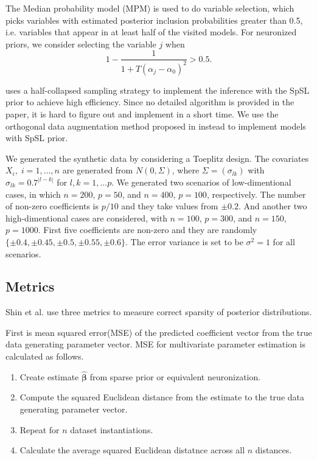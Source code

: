 The Median probability model (MPM) is used to do variable selection, which picks variables with estimated posterior inclusion
probabilities greater than 0.5, i.e. variables that appear in at least half of the visited models. For neuronized priors, we consider selecting the variable $j$ when
$$1-\frac{1}{1+ T(\alpha_j-\alpha_0)^2} > 0.5.$$

\citet{shin2021neuronized} uses a half-collapsed sampling strategy to implement the inference with the SpSL prior to achieve high efficiency. Since no detailed algorithm is provided in the paper, it is hard to figure out and implement in a short time. We use the orthogonal data augmentation method proposed in \citet{ghosh2011rao} instead to implement models with SpSL prior.

We generated the synthetic data by considering a Toeplitz design. The covariates $X_i,\; i=1,\dots,n$ are generated from $N(0,\Sigma)$, where $\Sigma = (\sigma_{lk})$ with $\sigma_{lk} = 0.7^{|l-k|}$ for $l,k = 1,\dots p$. We generated two scenarios of low-dimentional cases, in which $n=200$, $p=50$, and $n=400$, $p=100$, respectively. The number of non-zero coefficients is $p/10$ and they take values from $\pm 0.2$. And another two high-dimentional cases are considered, with $n=100$, $p=300$, and $n=150$, $p=1000$. First five coefficients are non-zero and they are randomly $\{\pm 0.4, \pm 0.45, \pm 0.5, \pm 0.55, \pm 0.6\}$. The error variance is set to be $\sigma^2=1$ for all scenarios.


\subsection{Metrics}
\label{sim_metrics}
Shin et al. use three metrics to measure correct sparsity of posterior distributions.

First is mean squared error(MSE) of the predicted coefficient vector from the true data generating parameter vector.
MSE for multivariate parameter estimation is calculated as follows.
\begin{enumerate}
    \item Create estimate $\hat{\boldsymbol{\beta}}$ from sparse prior or equivalent neuronization.
    \item Compute the squared Euclidean distance from the estimate to the true data generating parameter vector.
    \label{mse_computation}
    \item Repeat for $n$ dataset instantiations.
    \item Calculate the average squared Euclidean distatnce across all $n$ distances.
\end{enumerate}

